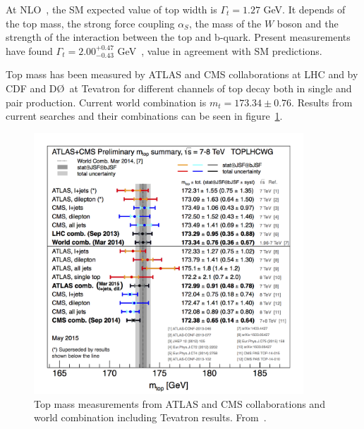At NLO~\cite{Jezabek19891}, the SM expected value of top width is $\Gamma_{t}=1.27$ GeV. It depends of the top mass, the strong force coupling $\alpha_{S}$, the mass of the $W$ boson and the strength of the interaction between the top and b-quark. Present measurements have found $\Gamma_{t}=2.00^{+0.47}_{-0.43}$ GeV~\cite{Abazov:2012vd}, value in agreement with SM predictions. 

Top mass has been measured by ATLAS and CMS collaborations at LHC and by CDF and D\O~at Tevatron for different channels of top decay both in single and pair production. Current world combination is $m_{t}=173.34\pm 0.76$. Results from current searches and their combinations can be seen in figure~\ref{fig:TopMass}. 

\begin{figure}[!Hhtbp]
  \begin{center}
    \includegraphics[width=0.9\textwidth]{figs/LHC_topmass_May2015.png}
    \caption{Top mass measurements from ATLAS and CMS collaborations and world combination including Tevatron results. From~\cite{TOPLHCWG}.}
    \label{fig:TopMass}
  \end{center}
\end{figure}

%
%

